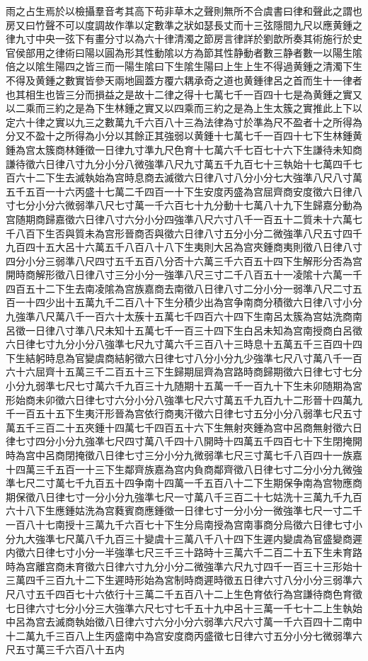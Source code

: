 雨之占生焉於以檢攝羣音考其高下苟非草木之聲則無所不合虞書曰律和聲此之謂也房又曰竹聲不可以度調故作準以定數準之狀如瑟長丈而十三弦隱間九尺以應黄鍾之律九寸中央一弦下有畫分寸以為六十律清濁之節房言律詳於劉歆所奏其術施行於史官侯部用之律術曰陽以圓為形其性動隂以方為節其性静動者數三静者數一以陽生隂倍之以隂生陽四之皆三而一陽生隂曰下生隂生陽曰上生上生不得過黄鍾之清濁下生不得及黄鍾之數實皆參天兩地圓蓋方覆六耦承奇之道也黄鍾律呂之首而生十一律者也其相生也皆三分而損益之是故十二律之得十七萬七千一百四十七是為黄鍾之實又以二乘而三約之是為下生林鍾之實又以四乘而三約之是為上生太簇之實推此上下以定六十律之實以九三之數萬九千六百八十三為法律為寸於準為尺不盈者十之所得為分又不盈十之所得為小分以其餘正其強弱以黄鍾十七萬七千一百四十七下生林鍾黄鍾為宫太簇商林鍾徵一日律九寸準九尺色育十七萬六千七百七十六下生謙待未知商謙待徵六日律八寸九分小分八微強準八尺九寸萬五千九百七十三執始十七萬四千七百六十二下生去滅執始為宫時息商去滅徵六日律八寸八分小分七大強準八尺八寸萬五千五百一十六丙盛十七萬二千四百一十下生安度丙盛為宫屈齊商安度徵六日律八寸七分小分六微弱準八尺七寸萬一千六百七十九分動十七萬八十九下生歸嘉分動為宫随期商歸嘉徵六日律八寸六分小分四強準八尺六寸八千一百五十二質未十六萬七千八百下生否與質未為宫形晉商否與徵六日律八寸五分小分二微強準八尺五寸四千九百四十五大呂十六萬五千八百八十八下生夷則大呂為宫夾鍾商夷則徵八日律八寸四分小分三弱準八尺四寸五千五百八分否十六萬三千六百五十四下生解形分否為宫開時商解形徵八日律八寸三分小分一強準八尺三寸二千八百五十一凌隂十六萬一千四百五十二下生去南凌隂為宫族嘉商去南徵八日律八寸二分小分一弱準八尺二寸五百一十四少出十五萬九千二百八十下生分積少出為宫争南商分積徵六日律八寸小分九強準八尺萬八千一百六十太蔟十五萬七千四百六十四下生南呂太簇為宫姑洗商南呂徵一日律八寸準八尺未知十五萬七千一百三十四下生白呂未知為宫南授商白呂徵六日律七寸九分小分八強準七尺九寸萬六千三百八十三時息十五萬五千三百四十四下生結躬時息為官變虞商結躬徵六日律七寸八分小分九少強準七尺八寸萬八千一百六十六屈齊十五萬三千二百五十三下生歸期屈齊為宫路時商歸期徵六日律七寸七分小分九弱準七尺七寸萬六千九百三十九随期十五萬一千一百九十下生未卯随期為宮形始商未卯徵六日律七寸六分小分八強準七尺六寸萬五千九百九十二形晉十四萬九千一百五十五下生夷汗形晉為宫依行商夷汗徵六日律七寸五分小分八弱準七尺五寸萬五千三百二十五夾鍾十四萬七千四百五十六下生無射夾鍾為宫中呂商無射徵六日律七寸四分小分九強凖七尺四寸萬八千四十八開時十四萬五千四百七十下生閉掩開時為宫中呂商閉掩徵八日律七寸三分小分九微弱準七尺三寸萬七千八百四十一族嘉十四萬三千五百一十三下生鄰齊族嘉為宫内負商鄰齊徵八日律七寸二分小分九微強準七尺二寸萬七千九百五十四争南十四萬一千五百八十二下生期保争南為宫物應商期保徵八日律七寸一分小分九強準七尺一寸萬八千三百二十七姑洗十三萬九千九百六十八下生應鍾姑洗為宫蕤賓商應鍾徵一日律七寸一分小分一微強準七尺一寸二千一百八十七南授十三萬九千六百七十下生分烏南授為宫南事商分烏徵六日律七寸小分九大強準七尺萬八千九百三十變虞十三萬八千八十四下生遲内變虞為官盛變商遲内徵六日律七寸小分一半強準七尺三千三十路時十三萬六千二百二十五下生未育路時為宫離宫商未育徵六日律六寸九分小分二微強準六尺九寸四千一百三十三形始十三萬四千三百九十二下生遲時形始為宮制時商遲時徵五日律六寸八分小分三弱準六尺八寸五千四百七十六依行十三萬二千五百八十二上生色育依行為宫謙待商色育徵七日律六寸七分小分三大強準六尺七寸七千五十九中呂十三萬一千七十二上生執始中呂為宫去滅商執始徵八日律六寸六分小分六弱準六尺六寸萬一千六百四十二南中十二萬九千三百八上生丙盛南中為宫安度商丙盛徵七日律六寸五分小分七微弱準六尺五寸萬三千六百八十五内